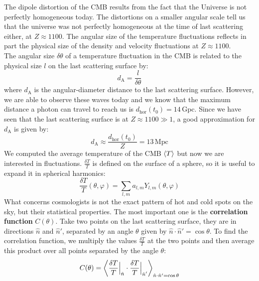 \documentclass[10.75pt,a4paper,openright,bottom=2cm]{article}
\begin{document}
The dipole distortion of the CMB results from the fact that the Universe is not perfectly homogeneous today. The distortions on a smaller angular scale tell us that the universe was not perfectly homogeneous at the time of last scattering either, at $Z\approx1100$. The angular size of the temperature fluctuations reflects in part the physical size of the density
and velocity fluctuations at $Z\approx1100$.\\
The angular size $\delta\theta$ of a temperature fluctuation in the CMB is related to the physical size $l$ on the last scattering surface by:
\[
d_{\text{A}}=\frac{l}{\delta\theta}
\]
where $d_{\text{A}}$ is the angular-diameter distance to the last scattering surface. However, we are able to observe these waves today and we know that the maximum distance a photon can travel to reach us is $d_{\text{hor}}(t_0)=14$\,Gpc. Since we have seen that the last scattering surface is at $Z\approx1100\gg1$, a good approximation for $d_{\text{A}}$ is given by:
\[
d_{\text{A}}\approx\frac{d_{\text{hor}}(t_0)}{Z}=13\,\text{Mpc}
\]
We computed the average temperature of the CMB $\Braket{T}$ but now we are interested in fluctuations. $\frac{\delta T}{T}$ is defined on the surface of a sphere, so it is useful to expand it in spherical harmonics:
\[
\frac{\delta T}{T}(\theta,\varphi)=\sum_{l,m}a_{l,m}Y_{l,m}(\theta,\varphi)
\]
What concerns cosmologists is not the exact pattern of hot and cold spots on the sky, but their statistical properties. The most important one is the \textbf{correlation function} $C(\theta)$. Take two points on the last scattering surface, they are in directions $\hat{n}$ and $\hat{n}'$, separated by an angle $\theta$ given by $\hat{n}\cdot\hat{n}'=\cos\theta$. To find the correlation function, we multiply the values $\frac{\delta T}{T}$ at the two points and then average this product over all points separated by the angle $\theta$:
\[
C(\theta)=\Braket{\frac{\delta T}{T}\Bigr|_{\substack{\hat{n}}}\cdot\frac{\delta T}{T}\Bigr|_{\substack{\hat{n}'}}}_{\hat{n}\cdot\hat{n}'=\cos\theta}
\]
\end{document}
